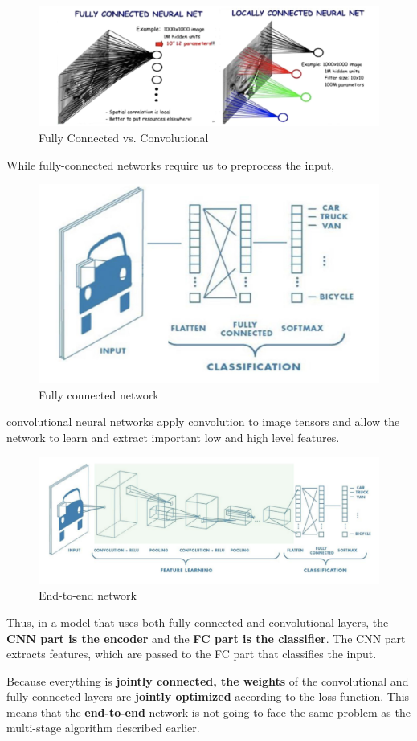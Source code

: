 \begin{figure}[h!t]
    \centering
    \includegraphics[width=0.5\linewidth]{fcvsconv.png}
    \caption{Fully Connected vs. Convolutional}
    \label{fig:enter-label}
\end{figure}

\newpage

While fully-connected networks require us to preprocess the input,

\begin{figure}[h!t]
    \centering
    \includegraphics[width=0.35\linewidth]{fc.png}
    \caption{Fully connected network}
    \label{fig:enter-label}
\end{figure}

convolutional neural networks apply convolution to image tensors and allow the network to learn and extract important low and high level features.

\begin{figure}[h!t]
    \centering
    \includegraphics[width=0.5\linewidth]{endtoend.png}
    \caption{End-to-end network}
    \label{fig:enter-label}
\end{figure}

Thus, in a model that uses both fully connected and convolutional layers, the \textbf{CNN part is the encoder} and the \textbf{FC part is the classifier}. The CNN part extracts features, which are passed to the FC part that classifies the input. \\

\begin{idea}
    Because everything is \textbf{jointly connected, the weights} of the convolutional and fully connected layers are \textbf{jointly optimized} according to the loss function. This means that the \textbf{end-to-end} network is not going to face the same problem as the multi-stage algorithm described earlier.
\end{idea}

